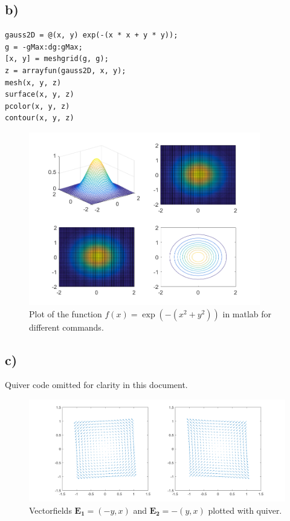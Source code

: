 \documentclass[12pt,a4paper]{article}
\begin{document}
	\subsection*{b)}
		\begin{lstlisting}
gauss2D = @(x, y) exp(-(x * x + y * y));
g = -gMax:dg:gMax;
[x, y] = meshgrid(g, g);
z = arrayfun(gauss2D, x, y);
mesh(x, y, z)
surface(x, y, z)
pcolor(x, y, z)
contour(x, y, z)
		\end{lstlisting}
		\begin{figure}[H]
			\centering
			\includegraphics[width=0.9\textwidth]{A1/A1_b.png}
			\caption[]{Plot of the function
			\(f(x)=\exp\left(-\left(x^2+y^2\right)\right)\) in matlab for different commands.}
		\end{figure}
	\subsection*{c)}
		Quiver code omitted for clarity in this document.
		\begin{figure}[H]
			\centering
			\includegraphics[width=\textwidth]{A1/A1_c.png}
			\caption[]{Vectorfields \(\mathbf{E_1}=(-y, x)\) and \(\mathbf{E_2}=-(y, x)\) plotted with quiver.}
		\end{figure}
\end{document}
